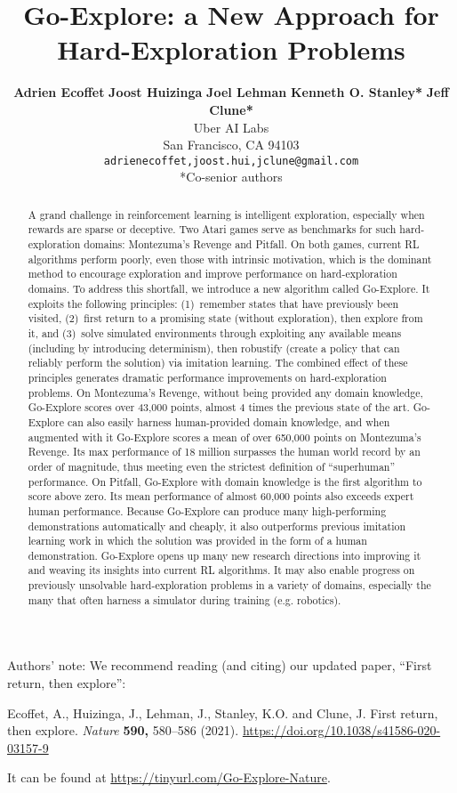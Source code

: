 \documentclass{article}
\title{Go-Explore: a New Approach for Hard-Exploration Problems }
\author{
\textbf{Adrien Ecoffet} \hspace{5mm} \textbf{Joost Huizinga} \hspace{5mm} \textbf{Joel Lehman} \hspace{5mm}  \textbf{Kenneth O. Stanley*}  \hspace{5mm}  \textbf{Jeff Clune*} \\
  Uber AI Labs\\
  San Francisco, CA 94103 \\
  \texttt{adrienecoffet,joost.hui,jclune@gmail.com} \\
  *Co-senior authors
}
\begin{document}
\maketitle

\vspace{-6mm}
Authors' note: We recommend reading (and citing) our updated paper, ``First return, then explore'': 

Ecoffet, A., Huizinga, J., Lehman, J., Stanley, K.O. and Clune, J. First return, then explore. \emph{Nature} \textbf{590,} 580–586 (2021). \href{https://doi.org/10.1038/s41586-020-03157-9}{https://doi.org/10.1038/s41586-020-03157-9}

It can be found at \href{https://tinyurl.com/Go-Explore-Nature}{https://tinyurl.com/Go-Explore-Nature}.
\vspace{4mm}


\begin{abstract}
A grand challenge in reinforcement learning is intelligent exploration, especially when rewards are sparse or deceptive. Two Atari games serve as benchmarks for such hard-exploration domains: Montezuma's Revenge and Pitfall. On both games, current RL algorithms perform poorly, even those with intrinsic motivation, which is the dominant method to encourage exploration and improve performance on hard-exploration domains.  To address this shortfall, we introduce a new algorithm called Go-Explore. 
It exploits the following principles: (1)~remember states that have previously been visited, (2)~first return to a promising state (without exploration), then explore from it, and (3)~solve simulated environments through exploiting any available means (including by introducing determinism), then robustify (create a policy that can reliably perform the solution) via imitation learning. The combined effect of these principles generates dramatic performance improvements on hard-exploration problems.
On Montezuma's Revenge, without being provided any domain knowledge, Go-Explore scores over 43,000 points, almost 4 times the previous state of the art. Go-Explore can also easily harness human-provided domain knowledge, and when augmented with it Go-Explore scores a mean of over 650,000 points on Montezuma's Revenge. Its max performance of 18 million surpasses the human world record by an order of magnitude, thus meeting even the strictest definition of ``superhuman'' performance. On Pitfall, Go-Explore with domain knowledge is the first algorithm to score above zero. Its mean performance of almost 60,000 points also exceeds expert human performance.
Because Go-Explore can produce many high-performing demonstrations automatically and cheaply, it also outperforms previous imitation learning work in which the solution was provided in the form of a human demonstration. Go-Explore opens up many new research directions into improving it and weaving its insights into current RL algorithms. It may also enable progress on previously unsolvable hard-exploration problems in a variety of domains, especially the many that often harness a simulator during training (e.g. robotics).

\end{abstract}
\end{document}
